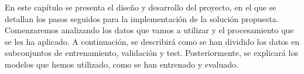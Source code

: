 En este capítulo se presenta el diseño y desarrollo del proyecto, en el que se detallan los pasos seguidos para la implementación de la solución propuesta. Comenzaremos analizando los datos que vamos a utilizar y el procesamiento que se les ha aplicado. A continuación, se describirá como se han dividido los datos en subconjuntos de entrenamiento, validación y test. Posteriormente, se explicará los modelos que hemos utilizado, como se han entrenado y evaluado.
